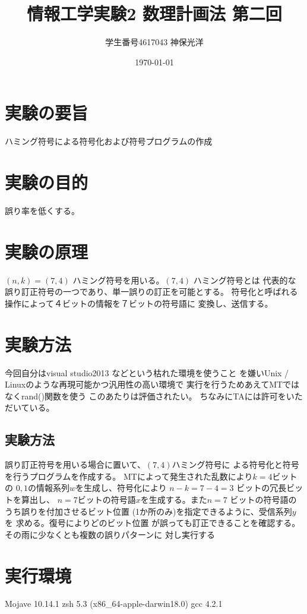 \documentclass{jsarticle}
\title{情報工学実験2 数理計画法 第二回}
\author{学生番号4617043 神保光洋}
\date{\today}
\begin{document}
\maketitle

\section{実験の要旨}
ハミング符号による符号化および符号プログラムの作成

\section{実験の目的}
誤り率を低くする。

\section{実験の原理}
$(n, k) = (7, 4)$ ハミング符号を用いる。$(7, 4)$ ハミング符号とは
代表的な誤り訂正符号の一つであり、単一誤りの訂正を可能とする。
符号化と呼ばれる操作によって４ビットの情報を７ビットの符号語に
変換し、送信する。

\section{実験方法}
今回自分はvisual studio2013 などという枯れた環境を使うこと
を嫌いUnix / Linuxのような再現可能かつ汎用性の高い環境で
実行を行うためあえてMTではなくrand()関数を使う
このあたりは評価されたい。
ちなみにTAには許可をいただいている。

\subsection{実験方法}
誤り訂正符号を用いる場合に置いて、$(7, 4)$ハミング符号に
よる符号化と符号を行うプログラムを作成する。
MTによって発生された乱数により$k = 4$ビットの
${0, 1}$の情報系列$w$を生成し、符号化により
$n - k = 7 - 4 = 3$ ビットの冗長ビットを算出し、
$n = 7$ビットの符号語$x$を生成する。また$n = 7$
ビットの符号語のうち誤りを付加させるビット位置
(1か所のみ)を指定できるように、受信系列$y$を
求める。復号によりどのビット位置
が誤っても訂正できることを確認する。
その雨に少なくとも複数の誤りパターンに
対し実行する

\section{実行環境}
Mojave 10.14.1
zsh 5.3 (x86\_64-apple-darwin18.0)
gcc 4.2.1
\end{document}
